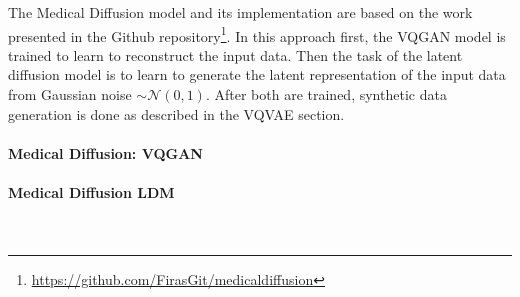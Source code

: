 The Medical Diffusion\cite{https://doi.org/10.48550/arxiv.2211.03364} model and its implementation are based on the work presented in the Github repository\footnote{\url{https://github.com/FirasGit/medicaldiffusion}}.
In this approach first, the VQGAN model is trained to learn to reconstruct the input data. Then the task of the latent diffusion model is to learn to generate the latent representation of the input data from Gaussian noise $\sim\mathcal{N}(0,1)$.
After both are trained, synthetic data generation is done as described in the VQVAE section.

\newpage
\paragraph{Medical Diffusion: VQGAN}


\newpage
\paragraph{Medical Diffusion LDM}\mbox{}\\


